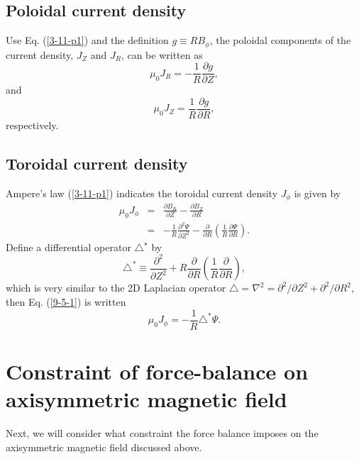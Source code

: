 \documentclass{article}
\begin{document}
\subsection{Poloidal current density}

Use Eq. (\ref{3-11-p1}) and the definition $g \equiv R B_{\phi}$, the poloidal
components of the current density, $J_Z$ and $J_R$, can be written as
\begin{equation}
  \label{5-2-a2} \mu_0 J_R = - \frac{1}{R} \frac{\partial g}{\partial Z},
\end{equation}
and
\begin{equation}
  \label{5-2-a1} \mu_0 J_Z = \frac{1}{R} \frac{\partial g}{\partial R},
\end{equation}
respectively.

\subsection{Toroidal current density}

Ampere's law (\ref{3-11-p1}) indicates the toroidal current density $J_{\phi}$
is given by
\begin{eqnarray}
  \mu_0 J_{\phi} & = & \frac{\partial B_R}{\partial Z} - \frac{\partial
  B_Z}{\partial R} \nonumber\\
  & = & - \frac{1}{R} \frac{\partial^2 \Psi}{\partial Z^2} -
  \frac{\partial}{\partial R} \left( \frac{1}{R} \frac{\partial \Psi}{\partial
  R} \right) .  \label{9-5-1}
\end{eqnarray}
Define a differential operator $\triangle^{\star}$ by
\begin{equation}
  \triangle^{\ast} \equiv \frac{\partial^2}{\partial Z^2} + R
  \frac{\partial}{\partial R} \left( \frac{1}{R} \frac{\partial}{\partial R}
  \right),
\end{equation}
which is very similar to the 2D Laplacian operator $\triangle = \nabla^2 =
\partial^2 / \partial Z^2 + \partial^2 / \partial R^2$, then Eq. (\ref{9-5-1})
is written
\begin{equation}
  \label{6-9-a1} \mu_0 J_{\phi} = - \frac{1}{R} \triangle^{\ast} \Psi .
\end{equation}

\section{Constraint of force-balance on axisymmetric magnetic field}

Next, we will consider what constraint the force balance imposes on the
axisymmetric magnetic field discussed above.
\end{document}
